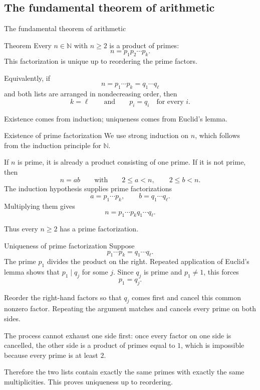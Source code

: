 \documentclass[aspectratio=169,11pt]{beamer}
\newcommand{\N}{\mathbb N}
\begin{document}
\subsection{The fundamental theorem of arithmetic}

\begin{frame}{The fundamental theorem of arithmetic}
  \begin{block}{Theorem}
    Every \(n\in\N\) with \(n\ge2\) is a product of primes:
    \[
      n=p_1p_2\cdots p_k.
    \]
    This factorization is unique up to reordering the prime factors.
  \end{block}

  Equivalently, if
  \[
    n=p_1\cdots p_k=q_1\cdots q_\ell
  \]
  and both lists are arranged in nondecreasing order, then
  \[
    k=\ell
    \qquad\text{and}\qquad
    p_i=q_i\quad\text{for every }i.
  \]

  Existence comes from induction; uniqueness comes from Euclid's lemma.
\end{frame}

\begin{frame}{Existence of prime factorization}
  We use strong induction on \(n\), which follows from the induction principle
  for \(\N\).

  If \(n\) is prime, it is already a product consisting of one prime.  If it
  is not prime, then
  \[
    n=ab
    \qquad\text{with}\qquad
    2\le a<n,\qquad 2\le b<n.
  \]
  The induction hypothesis supplies prime factorizations
  \[
    a=p_1\cdots p_k,
    \qquad
    b=q_1\cdots q_\ell.
  \]
  Multiplying them gives
  \[
    n=p_1\cdots p_kq_1\cdots q_\ell.
  \]

  Thus every \(n\ge2\) has a prime factorization.
\end{frame}

\begin{frame}{Uniqueness of prime factorization}
  Suppose
  \[
    p_1\cdots p_k=q_1\cdots q_\ell.
  \]
  The prime \(p_1\) divides the product on the right.  Repeated application of
  Euclid's lemma shows that \(p_1\mid q_j\) for some \(j\).  Since \(q_j\) is
  prime and \(p_1\ne1\), this forces
  \[
    p_1=q_j.
  \]

  Reorder the right-hand factors so that \(q_j\) comes first and cancel this
  common nonzero factor.  Repeating the argument matches and cancels every
  prime on both sides.

  The process cannot exhaust one side first: once every factor on one side
  is cancelled, the other side is a product of primes equal to \(1\), which
  is impossible because every prime is at least \(2\).

  Therefore the two lists contain exactly the same primes with exactly the
  same multiplicities.  This proves uniqueness up to reordering.
\end{frame}
\end{document}
